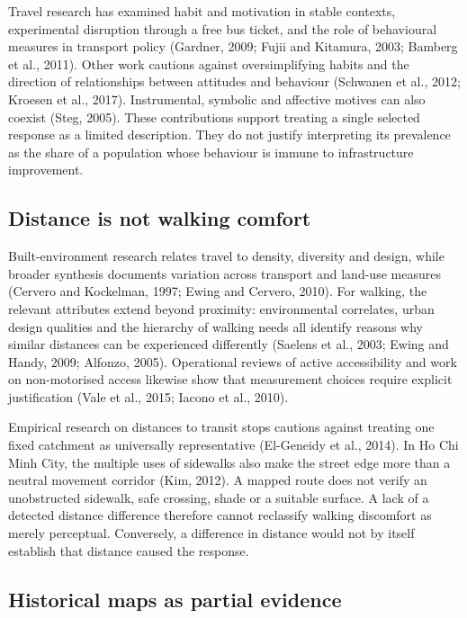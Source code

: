 \documentclass[
  11pt,
  a4paper,
]{article}
\begin{document}
Travel research has examined habit and motivation in stable contexts,
experimental disruption through a free bus ticket, and the role of
behavioural measures in transport policy (Gardner, 2009; Fujii and
Kitamura, 2003; Bamberg et al., 2011). Other work cautions against
oversimplifying habits and the direction of relationships between
attitudes and behaviour (Schwanen et al., 2012; Kroesen et al., 2017).
Instrumental, symbolic and affective motives can also coexist (Steg,
2005). These contributions support treating a single selected response
as a limited description. They do not justify interpreting its
prevalence as the share of a population whose behaviour is immune to
infrastructure improvement.

\subsection{Distance is not walking
comfort}\label{distance-is-not-walking-comfort}

Built-environment research relates travel to density, diversity and
design, while broader synthesis documents variation across transport and
land-use measures (Cervero and Kockelman, 1997; Ewing and Cervero,
2010). For walking, the relevant attributes extend beyond proximity:
environmental correlates, urban design qualities and the hierarchy of
walking needs all identify reasons why similar distances can be
experienced differently (Saelens et al., 2003; Ewing and Handy, 2009;
Alfonzo, 2005). Operational reviews of active accessibility and work on
non-motorised access likewise show that measurement choices require
explicit justification (Vale et al., 2015; Iacono et al., 2010).

Empirical research on distances to transit stops cautions against
treating one fixed catchment as universally representative (El-Geneidy
et al., 2014). In Ho Chi Minh City, the multiple uses of sidewalks also
make the street edge more than a neutral movement corridor (Kim, 2012).
A mapped route does not verify an unobstructed sidewalk, safe crossing,
shade or a suitable surface. A lack of a detected distance difference
therefore cannot reclassify walking discomfort as merely perceptual.
Conversely, a difference in distance would not by itself establish that
distance caused the response.

\subsection{Historical maps as partial
evidence}\label{historical-maps-as-partial-evidence}
\end{document}
